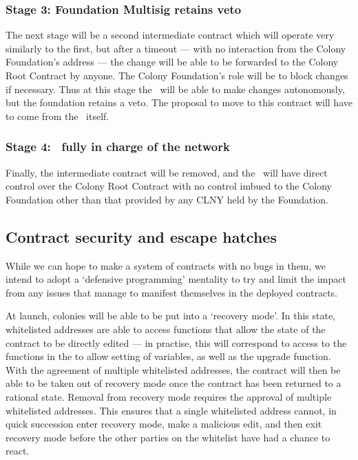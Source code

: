\subsubsection*{Stage 3: Foundation Multisig retains veto}
The next stage will be a second intermediate contract which will operate very similarly to the first, but after a timeout --- with no interaction from the Colony Foundation's address --- the change will be able to be forwarded to the Colony Root Contract by anyone. The Colony Foundation's role will be to block changes if necessary. Thus at this stage the \rc\ will be able to make changes autonomously, but the foundation retains a veto.  The proposal to move to this contract will have to come from the \rc\ itself. 

\subsubsection*{Stage 4: \rc\ fully in charge of the network}
Finally, the intermediate contract will be removed, and the \rc\ will have direct control over the Colony Root Contract with no control imbued to the Colony Foundation other than that provided by any CLNY held by the Foundation. 

\subsection{Contract security and escape hatches}\label{sec:escape-hatches}
While we can hope to make a system of contracts with no bugs in them, we intend to adopt a `defensive programming' mentality to try and limit the impact from any issues that manage to manifest themselves in the deployed contracts.

At launch, colonies will be able to be put into a `recovery mode'. In this state, whitelisted addresses are able to access functions that allow the state of the contract to be directly edited --- in practise, this will correspond to access to the functions in the  to allow setting of variables, as well as the upgrade function. With the agreement of multiple whitelisted addresses, the contract will then be able to be taken out of recovery mode once the contract has been returned to a rational state. Removal from recovery mode requires the approval of multiple whitelisted addresses. This ensures that a single whitelisted address cannot, in quick succession enter recovery mode, make a malicious edit, and then exit recovery mode before the other parties on the whitelist have had a chance to react.

